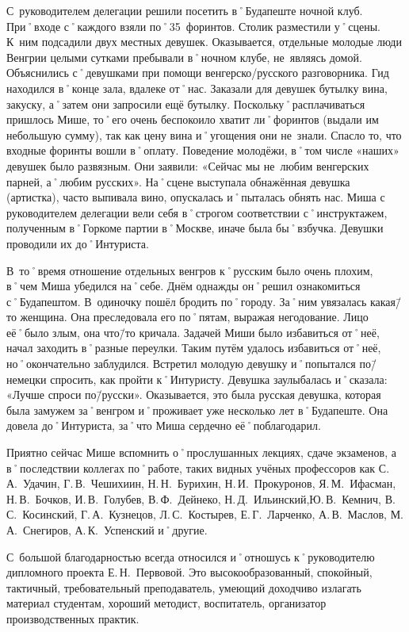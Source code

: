 С~руководителем делегации решили посетить в˚Будапеште ночной клуб. При˚входе с˚каждого взяли по˚35~форинтов. Столик разместили у˚сцены. К~ним подсадили двух местных девушек. Оказывается, отдельные молодые люди Венгрии целыми сутками пребывали в˚ночном клубе, не~являясь домой. Объяснились с˚девушками при помощи венгерско\-/русского разговорника. Гид находился в˚конце зала, вдалеке от˚нас. Заказали для девушек бутылку вина, закуску, а˚затем они запросили ещё бутылку. Поскольку˚расплачиваться пришлось Мише, то˚его очень беспокоило хватит ли˚форинтов (выдали им небольшую сумму), так как цену вина и˚угощения они не~знали. Спасло то, что входные форинты вошли в˚оплату. Поведение молодёжи, в˚том числе «наших» девушек было развязным. Они заявили: «Сейчас мы не~любим венгерских парней, а˚любим русских». На˚сцене выступала обнажённая девушка (артистка), часто выпивала вино, опускалась и˚пыталась обнять нас. Миша с руководителем делегации вели себя в˚строгом соответствии с˚инструктажем, полученным в˚Горкоме партии в˚Москве, иначе была бы˚взбучка. Девушки проводили их до˚Интуриста. 

В~то˚время отношение отдельных венгров к˚русским было очень плохим, в˚чем Миша убедился на˚себе.
Днём однажды он˚решил ознакомиться с˚Будапештом. В~одиночку пошёл бродить по˚городу. За˚ним увязалась какая\=/то женщина. Она преследовала его по˚пятам, выражая негодование. Лицо её˚было злым, она что\=/то кричала. Задачей Миши было избавиться от˚неё, начал заходить в˚разные переулки. Таким путём удалось избавиться от˚неё, но˚окончательно заблудился. Встретил молодую девушку и˚попытался по\=/немецки спросить, как пройти к˚Интуристу. Девушка заулыбалась и˚сказала: «Лучше спроси по\=/русски». Оказывается, это была русская девушка, которая была замужем за˚венгром и˚проживает уже несколько лет в˚Будапеште. Она довела до˚Интуриста, за˚что Миша сердечно её˚поблагодарил. 

Приятно сейчас Мише вспомнить о˚прослушанных лекциях, сдаче экзаменов, а в˚последствии коллегах по˚работе, таких видных учёных профессоров как С.\,А.~Удачин, Г.\,В.~Чешихиин, Н.\,Н.~Бурихин, Н.\,И.~Прокуронов, Я.\,М.~Ифасман, Н.\,В.~Бочков, И.\,В.~Голубев, В.\,Ф.~Дейнеко, Н.\,Д.~Ильинский,Ю.\,В.~Кемнич, В.\,С.~Косинский, Г.\,А.~Кузнецов, Л.\,С.~Костырев, Е.\,Г.~Ларченко, А.\,В.~Маслов, М.\,А.~Снегиров, А.\,К.~Успенский и˚другие.

С~большой благодарностью всегда относился и˚отношусь к˚руководителю дипломного проекта Е.\,Н.~Первовой. Это высокообразованный, спокойный, тактичный, требовательный преподаватель, умеющий доходчиво излагать материал студентам, хороший методист, воспитатель, организатор производственных практик.

